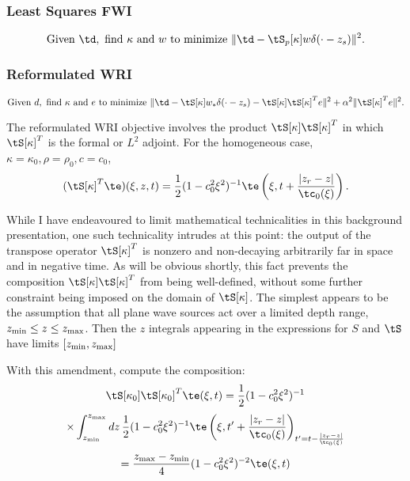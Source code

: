 \subsubsection{Least Squares FWI}

\begin{equation}
  \label{eqn:defolspw}
  \mbox{Given } \td, \mbox{ find }\kappa \mbox{ and }w \mbox{ to
    minimize }
  \| \td -  \tS_p[\kappa]w\delta(\cdot-z_s)\|^2.
\end{equation}

\subsubsection{Reformulated WRI}

\begin{equation}
  \label{eqn:defwrireformpw}
  \mbox{Given } d, \mbox{ find }\kappa \mbox{ and }e \mbox{ to
    minimize }
  \| \td -  \tS[\kappa]w_*\delta(\cdot-z_s) - \tS[\kappa]\tS[\kappa]^Te\|^2+\alpha^2\|\tS[\kappa]^Te\|^2.
\end{equation}
                              
The reformulated WRI objective involves 
the product $\tS[\kappa]\tS[\kappa]^T$ in which $\tS[\kappa]^T$ is the
formal or $L^2$ adjoint. For the homogeneous case,
$\kappa=\kappa_0,\rho=\rho_0,c=c_0$,
\begin{equation}
  \label{eqn:stmodhompwtrans}
  (\tS[\kappa]^T\te)(\xi,z,t)=\frac{1}{2}(1-c_0^2\xi^2)^{-1}\te\left(\xi,t +
    \frac{|z_r-z|}{\tc_0(\xi)}\right). 
\end{equation}

While I have endeavoured to limit mathematical technicalities in this background
presentation, one such technicality intrudes at this point: the
output of the transpose operator $\tS[\kappa]^T$ is nonzero and non-decaying arbitrarily
far in space and in negative time. As will be obvious shortly, this
fact prevents the composition $\tS[\kappa]\tS[\kappa]^T$ from being
well-defined, without some further constraint being imposed on the
domain of $\tS[\kappa]$. The simplest appears to be the assumption
that all plane wave sources act over a limited depth range, $z_{\rm min} \le z
\le z_{\rm max}$. Then the $z$ integrals appearing in the expressions
for $S$ and $\tS$ have limits $[z_{\rm min},z_{\rm max}]$

With this amendment, compute the composition:
\[
  \tS[\kappa_0]\tS[\kappa_0]^T\te(\xi,t) = \frac{1}{2}(1-c_0^2\xi^2)^{-1}
\]
\[
  \times 
  \int_{z_{\rm min}}^{z_{\rm max}} dz\, \frac{1}{2}(1-c_0^2\xi^2)^{-1}\te\left(\xi,t' +
    \frac{|z_r-z|}{\tc_0(\xi)}\right)_{t'=t-\frac{|z_r-z|}{\tc_0(\xi)}}
\]
\begin{equation}
  \label{eqn:stmodhompwnorm}
 = \frac{z_{\rm max}-z_{\rm min}}{4}(1-c_0^2\xi^2)^{-2}\te(\xi,t) 
\end{equation}

